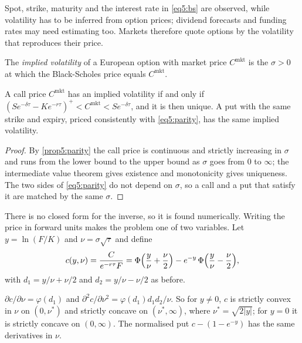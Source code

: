 \begin{chapterrefs}
Spot, strike, maturity and the interest rate in \cref{eq5:bs} are observed, while volatility has to
be inferred from option prices; dividend forecasts and funding rates may need estimating too. Markets
therefore quote options by the volatility that reproduces their price.

\begin{definition}\label{def5:iv}
The \emph{implied volatility} of a European option with market price $C^{\mathrm{mkt}}$ is the $\sigma>0$ at which the
Black-Scholes price equals $C^{\mathrm{mkt}}$.
\end{definition}

\begin{proposition}\label{prop5:ivexist}
A call price $C^{\mathrm{mkt}}$ has an implied volatility if and only if
$(Se^{-\delta\tau}-Ke^{-r\tau})^+<C^{\mathrm{mkt}}<Se^{-\delta\tau}$, and it is then unique. A put with the same strike and
expiry, priced consistently with \cref{eq5:parity}, has the same implied volatility.
\end{proposition}

\begin{proof}
By \cref{prop5:parity} the call price is continuous and strictly increasing in $\sigma$ and runs from
the lower bound to the upper bound as $\sigma$ goes from $0$ to $\infty$; the intermediate value
theorem gives existence and monotonicity gives uniqueness. The two sides of \cref{eq5:parity} do not
depend on $\sigma$, so a call and a put that satisfy it are matched by the same $\sigma$.
\end{proof}

There is no closed form for the inverse, so it is found numerically. Writing the price in forward
units makes the problem one of two variables. Let $y=\ln(F/K)$ and $\nu=\sigma\sqrt\tau$ and define
\begin{equation}\label{eq5:normcall}
  c(y,\nu)=\frac{C}{e^{-r\tau}F}=\Phi\Bigl(\frac{y}{\nu}+\frac{\nu}{2}\Bigr)-e^{-y}\,\Phi\Bigl(\frac{y}{\nu}-\frac{\nu}{2}\Bigr),
\end{equation}
with $d_1=y/\nu+\nu/2$ and $d_2=y/\nu-\nu/2$ as before.

\begin{lemma}\label{lem5:shape}
$\partial c/\partial \nu=\varphi(d_1)$ and $\partial^2c/\partial \nu^2=\varphi(d_1)d_1d_2/\nu$. So for $y\ne0$,
$c$ is strictly convex in $\nu$ on $(0,\nu^*)$ and strictly concave on $(\nu^*,\infty)$, where
$\nu^*=\sqrt{2|y|}$; for $y=0$ it is strictly concave on $(0,\infty)$. The normalised put
$c-(1-e^{-y})$ has the same derivatives in $\nu$.
\end{lemma}


\end{chapterrefs}
